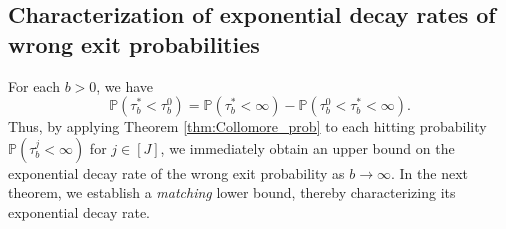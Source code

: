 \documentclass[aap,preprint]{imsart}
\newcommand{\Pro}{{\mathbb{P}}}
\theoremstyle{plain}
\theoremstyle{definition}
\begin{document}







\subsection{Characterization of exponential decay rates of wrong exit probabilities} 
For each $b > 0$, we have 
\[
\Pro(\tau_b^* < \tau_b^0) = \Pro(\tau_b^* < \infty) - \Pro\left( \tau_b^0 < \tau_b^*  < \infty \right).
\]
Thus, by applying Theorem \ref{thm:Collomore_prob} to each hitting probability $\Pro(\tau_b^{j} < \infty)$ for $j \in [J]$, we immediately obtain an upper bound on the exponential decay rate of the wrong exit probability as $b \to \infty$. In the next theorem, we establish a \emph{matching} lower bound, thereby characterizing its exponential decay rate. 

\end{document}
